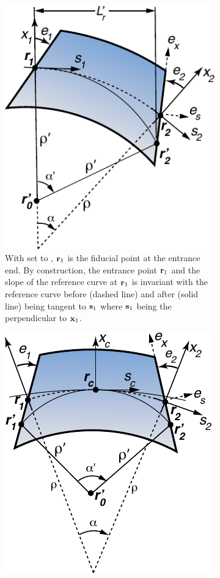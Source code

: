 \begin{figure}[tb]
  \centering
  \hfill
  \begin{subfigure}[b]{0.4\textwidth}
    \includegraphics{bend-vary1.pdf}
    \caption{
With  set to , ${\bf r}_1$ is the fiducial point at the entrance
end.  By construction, the entrance point ${\bf r}_1$ and the
slope of the reference curve at ${\bf r}_1$ is invariant with the reference curve before (dashed line)
and after (solid line) being tangent to ${\bf s}_1$ where ${\bf s}_1$ being the perpendicular to ${\bf x}_1$.
    }
    \label{f:bend.fid1}
  \end{subfigure}
  \hfill
  \begin{subfigure}[b]{0.4\textwidth}
    \includegraphics{bend-vary2.pdf}

\end{subfigure}
\end{figure}
